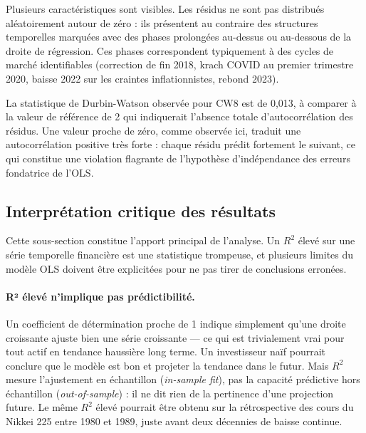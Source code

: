 \documentclass[11pt,a4paper]{article}
\begin{document}
Plusieurs caractéristiques sont visibles. Les résidus ne sont pas
distribués aléatoirement autour de zéro : ils présentent au contraire
des structures temporelles marquées avec des phases prolongées au-dessus
ou au-dessous de la droite de régression. Ces phases correspondent
typiquement à des cycles de marché identifiables (correction de fin
2018, krach COVID au premier trimestre 2020, baisse 2022 sur les
craintes inflationnistes, rebond 2023).

La statistique de Durbin-Watson observée pour CW8 est de
0,013, à comparer à la valeur de référence de 2 qui indiquerait
l'absence totale d'autocorrélation des résidus. Une valeur proche de
zéro, comme observée ici, traduit une autocorrélation positive très
forte : chaque résidu prédit fortement le suivant, ce qui constitue
une violation flagrante de l'hypothèse d'indépendance des erreurs
fondatrice de l'OLS.

\subsection{Interprétation critique des résultats}
\label{subsec:critique}

Cette sous-section constitue l'apport principal de l'analyse. Un $R^2$
élevé sur une série temporelle financière est une statistique
trompeuse, et plusieurs limites du modèle OLS doivent être explicitées
pour ne pas tirer de conclusions erronées.

\paragraph{R² élevé n'implique pas prédictibilité.}
Un coefficient de détermination proche de 1 indique simplement qu'une
droite croissante ajuste bien une série croissante — ce qui est
trivialement vrai pour tout actif en tendance haussière long terme.
Un investisseur naïf pourrait conclure que le modèle est \og bon \fg et
projeter la tendance dans le futur. Mais $R^2$ mesure l'ajustement en
échantillon (\textit{in-sample fit}), pas la capacité prédictive hors
échantillon (\textit{out-of-sample}) : il ne dit rien de la
pertinence d'une projection future. Le même $R^2$ élevé pourrait être
obtenu sur la rétrospective des cours du Nikkei 225 entre 1980 et 1989,
juste avant deux décennies de baisse continue.
\end{document}
